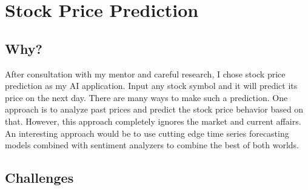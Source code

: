 \documentclass{report}
\begin{document}
\section{Stock Price Prediction}
\subsection{Why?}

After consultation with my mentor and careful research, I chose stock price prediction as my AI application. Input any stock symbol and it will predict its price on the next day. There are many ways to make such a prediction. One approach is to analyze past prices and predict the stock price behavior based on that. However, this approach completely ignores the market and current affairs. An interesting approach would be to use cutting edge time series forecasting models combined with sentiment analyzers to combine the best of both worlds.

\subsection{Challenges}
\end{document}
